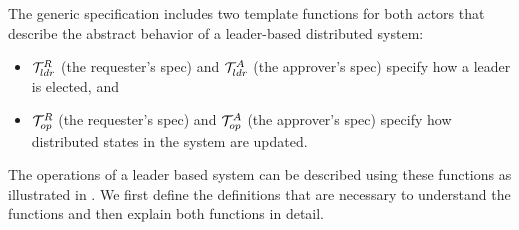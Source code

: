 


%
%


%
%

The generic specification includes two template functions for both actors that describe the
abstract behavior of a leader-based distributed system:
\begin{itemize}[leftmargin=*]
	\item $\mathcal{T}^{R}_{ldr}$ (the requester's spec) and  $\mathcal{T}^{A}_{ldr}$ (the approver's spec) specify how a leader is elected, and
	\item $\mathcal{T}^{R}_{op}$  (the requester's spec) and $\mathcal{T}^{A}_{op}$ (the approver's spec)  specify how distributed states in the system are
		updated.
\end{itemize}
The operations of a leader based system can be described using these functions
as illustrated in .
We first define the definitions that are necessary to understand the
functions and then explain both functions in detail.

